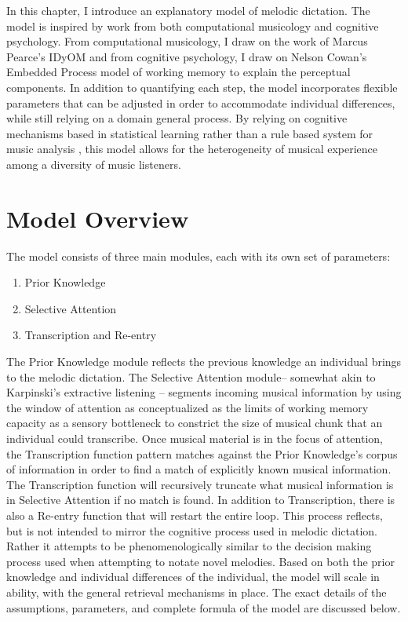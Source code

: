 \documentclass[12pt,]{book}
\providecommand{\tightlist}{%
  \setlength{\itemsep}{0pt}\setlength{\parskip}{0pt}}
\begin{document}
In this chapter, I introduce an explanatory model of melodic dictation.
The model is inspired by work from both computational musicology and cognitive psychology.
From computational musicology, I draw on the work of Marcus Pearce's IDyOM \citep{pearceConstructionEvaluationStatistical2005} and from cognitive psychology, I draw on Nelson Cowan's Embedded Process model of working memory \citep{cowanEvolvingConceptionsMemory1988, cowanMagicalMysteryFour2010} to explain the perceptual components.
In addition to quantifying each step, the model incorporates flexible parameters that can be adjusted in order to accommodate individual differences, while still relying on a domain general process.
By relying on cognitive mechanisms based in statistical learning rather than a rule based system for music analysis \citep{lerdahlGenerativeTheoryTonal1986, narmourAnalysisCognitionBasic1990, narmourAnalysisCognitionMelodic1992, temperleyCognitionBasicMusical2004}, this model allows for the heterogeneity of musical experience among a diversity of music listeners.

\hypertarget{model-overview}{%
\section{Model Overview}\label{model-overview}}

The model consists of three main modules, each with its own set of parameters:

\begin{enumerate}
\def\labelenumi{\arabic{enumi}.}
\tightlist
\item
  Prior Knowledge
\item
  Selective Attention
\item
  Transcription and Re-entry
\end{enumerate}

The Prior Knowledge module reflects the previous knowledge an individual brings to the melodic dictation.
The Selective Attention module-- somewhat akin to Karpinski's extractive listening \citep{karpinskiAuralSkillsAcquisition2000, karpinskiModelMusicPerception1990}-- segments incoming musical information by using the window of attention as conceptualized as the limits of working memory capacity as a sensory bottleneck to constrict the size of musical chunk that an individual could transcribe.
Once musical material is in the focus of attention, the Transcription function pattern matches against the Prior Knowledge's corpus of information in order to find a match of explicitly known musical information.
The Transcription function will recursively truncate what musical information is in Selective Attention if no match is found.
In addition to Transcription, there is also a Re-entry function that will restart the entire loop.
This process reflects, but is not intended to mirror the cognitive process used in melodic dictation.
Rather it attempts to be phenomenologically similar to the decision making process used when attempting to notate novel melodies.
Based on both the prior knowledge and individual differences of the individual, the model will scale in ability, with the general retrieval mechanisms in place.
The exact details of the assumptions, parameters, and complete formula of the model are discussed below.
\end{document}

